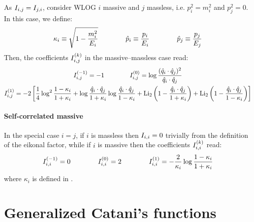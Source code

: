 As $ I_{i,j} = I_{j,i} $, consider WLOG $ i $ massive and $ j $ massless, i.e. $ p_i^2 = m_i^2 $ and $ p_j^2 = 0 $. In this case, we define:
\begin{equation}
  \kappa_i \equiv \sqrt{1 - \frac{m_i^2}{E_i}}
  \qquad \qquad
  \hat{p}_i \equiv \frac{p_i}{E_i}
  \qquad \qquad
  \hat{p}_j \equiv \frac{p_j}{E_j}
  \label{eq:kappa-def}
\end{equation}
Then, the coefficients $ I_{i,j}^{(k)} $ in the massive--massless case read:
\begin{equation}
  \begin{gathered}
    I_{i,j}^{(-1)} = -1
    \qquad \qquad
    I_{i,j}^{(0)} = \log \frac{(\hat{q}_i \cdot \hat{q}_j)^2}{\hat{q}_i \cdot \hat{q}_j}
    \\
    I_{i,j}^{(1)} = -2 \left[ \frac{1}{4} \log^2 \frac{1 - \kappa_i}{1 + \kappa_i} + \log \frac{\hat{q}_i \cdot \hat{q}_j}{1 + \kappa_i} \log \frac{\hat{q}_i \cdot \hat{q}_j}{1 - \kappa_i} + \operatorname{Li_2} \left( 1 - \frac{\hat{q}_i \cdot \hat{q}_j}{1 + \kappa_i} \right) + \operatorname{Li_2} \left( 1 - \frac{\hat{q}_i \cdot \hat{q}_j}{1 - \kappa_i} \right) \right]
  \end{gathered}
  \label{eq:i-mnm}
\end{equation}

\paragraph{Self-correlated massive}

In the special case $ i = j $, if $ i $ is massless then $ I_{i,i} = 0 $ trivially from the definition of the eikonal factor, while if $ i $ is massive then the coefficients $ I_{i,i}^{(k)} $ read:
\begin{equation}
  I_{i,i}^{(-1)} = 0
  \qquad \qquad
  I_{i,i}^{(0)} = 2
  \qquad \qquad
  I_{i,i}^{(1)} = - \frac{2}{\kappa_i} \log \frac{1 - \kappa_i}{1 + \kappa_i}
  \label{eq:i-self}
\end{equation}
where $ \kappa_i $ is defined in .

\section{Generalized Catani's functions}
\label{sec:cat-fun}

